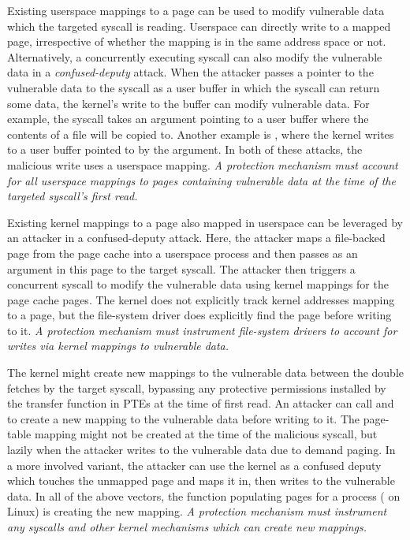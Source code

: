 Existing userspace mappings to a page can be used to modify
vulnerable data which the targeted syscall is reading.
Userspace can directly write to a mapped page, irrespective of whether the mapping is
in the same address space or not.
Alternatively, a concurrently executing syscall can also modify the
vulnerable data in a \emph{confused-deputy} attack.
When the attacker passes a pointer to the vulnerable data to
the syscall as a user buffer in which the syscall can return some
data, the kernel's write to the buffer can modify vulnerable data.
For example, the  syscall takes an argument pointing
to a user buffer where the contents of a file will be copied to.
Another example is , where the kernel writes to
a user buffer pointed to by the  argument.
In both of these attacks, the malicious write uses a userspace
mapping.
\emph{A protection mechanism must account for all userspace
mappings to pages containing vulnerable data at the time of the
targeted syscall's first read.}

Existing kernel mappings to a page also mapped in userspace can be
leveraged by an attacker in a confused-deputy attack.
Here, the attacker maps a file-backed page from the page cache into a
userspace process and then passes as an argument in this page to the
target syscall.
The attacker then triggers a concurrent  syscall to modify the
vulnerable data using kernel mappings for the page cache
pages.
The kernel does not explicitly track kernel addresses mapping to a page,
but the file-system driver does explicitly find the page before writing to it.
\emph{A protection mechanism must instrument file-system
drivers to account for writes via kernel mappings to vulnerable data.}

The kernel might create new mappings to the vulnerable data
between the double fetches by the target syscall, bypassing any 
protective permissions installed by the transfer function in 
PTEs at the time of first read.
An attacker can call  and  to create
a new mapping to the vulnerable data before writing to it.
The page-table mapping might not be created at the time of the malicious
syscall, but lazily when the attacker writes to the vulnerable data
due to demand paging.
In a more involved variant, the attacker can use the kernel as a
confused deputy which touches the unmapped page and maps it in,
then writes to the vulnerable data.
In all of the above vectors, the function populating pages for a
process ( on Linux) is creating the new mapping.
\emph{A protection mechanism must instrument any syscalls
and other kernel mechanisms which can create new mappings.}

